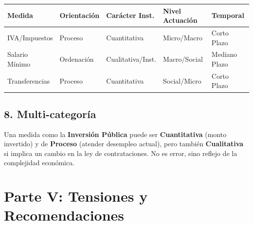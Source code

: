 \documentclass[12pt,spanish]{article}
\newcounter{none}
\begin{document}
{\def\LTcaptype{none} %
\begin{longtable}[]{@{}
  >{\raggedright\arraybackslash}p{}
  >{\raggedright\arraybackslash}p{}
  >{\raggedright\arraybackslash}p{}
  >{\raggedright\arraybackslash}p{}
  >{\raggedright\arraybackslash}p{}@{}}
\toprule\noalign{}
\begin{minipage}[b]{\linewidth}\raggedright
Medida
\end{minipage} & \begin{minipage}[b]{\linewidth}\raggedright
Orientación
\end{minipage} & \begin{minipage}[b]{\linewidth}\raggedright
Carácter Inst.
\end{minipage} & \begin{minipage}[b]{\linewidth}\raggedright
Nivel Actuación
\end{minipage} & \begin{minipage}[b]{\linewidth}\raggedright
Temporal
\end{minipage} \\
\midrule\noalign{}
\endhead
\bottomrule\noalign{}
\endlastfoot
IVA/Impuestos & Proceso & Cuantitativa & Micro/Macro & Corto Plazo \\
Salario Mínimo & Ordenación & Cualitativa/Inst. & Macro/Social & Mediano
Plazo \\
Transferencias & Proceso & Cuantitativa & Social/Micro & Corto Plazo \\
\end{longtable}
}

\subsection{8. Multi-categoría}\label{multi-categoruxeda}

Una medida como la \textbf{Inversión Pública} puede ser
\textbf{Cuantitativa} (monto invertido) y de \textbf{Proceso} (atender
desempleo actual), pero también \textbf{Cualitativa} si implica un
cambio en la ley de contrataciones. No es error, sino reflejo de la
complejidad económica.

\section{Parte V: Tensiones y
Recomendaciones}\label{parte-v-tensiones-y-recomendaciones}
\end{document}
